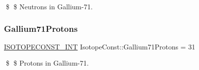 \$ \$ Neutrons in Gallium-\/71. \mbox{\label{group___isotope_const-_gallium-_ga71_ga04eae07a1e01044cb09e1c41a42a74f3}} 
\subsubsection{\texorpdfstring{Gallium71\+Protons}{Gallium71Protons}}
{\footnotesize\ttfamily \mbox{\hyperlink{group___isotope_const-_macros_ga5f18360b3e99483a35c32d789e62621c}{I\+S\+O\+T\+O\+P\+E\+C\+O\+N\+S\+T\+\_\+\+I\+NT}} Isotope\+Const\+::\+Gallium71\+Protons = 31}

\$ \$ Protons in Gallium-\/71. 